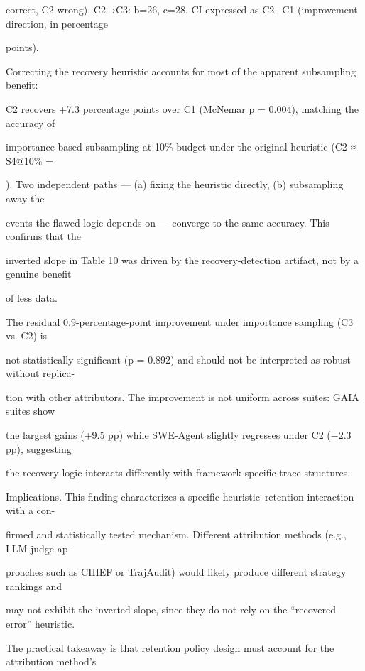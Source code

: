 \begin{flushleft}
\noindent  correct, C2 wrong). C2→C3: b=26, c=28. CI expressed as C2−C1 (improvement direction, in percentage\par
\noindent  points).\par
\par\smallskip
\noindent  Correcting the recovery heuristic accounts for most of the apparent subsampling benefit:\par
\noindent C2 recovers +7.3 percentage points over C1 (McNemar p = 0.004), matching the accuracy of\par
\noindent importance-based subsampling at 10\% budget under the original heuristic (C2 ≈ S4@10\% =\par
{}). Two independent paths — (a) fixing the heuristic directly, (b) subsampling away the\par
\noindent events the flawed logic depends on — converge to the same accuracy. This confirms that the\par
\noindent inverted slope in Table 10 was driven by the recovery-detection artifact, not by a genuine benefit\par
\noindent of less data.\par
\noindent  The residual 0.9-percentage-point improvement under importance sampling (C3 vs. C2) is\par
\noindent not statistically significant (p = 0.892) and should not be interpreted as robust without replica-\par
\noindent tion with other attributors. The improvement is not uniform across suites: GAIA suites show\par
\noindent the largest gains (+9.5 pp) while SWE-Agent slightly regresses under C2 (−2.3 pp), suggesting\par
\noindent the recovery logic interacts differently with framework-specific trace structures.\par
\par\smallskip
\noindent Implications. This finding characterizes a specific heuristic–retention interaction with a con-\par
\noindent firmed and statistically tested mechanism. Different attribution methods (e.g., LLM-judge ap-\par
\noindent proaches such as CHIEF or TrajAudit) would likely produce different strategy rankings and\par
\noindent may not exhibit the inverted slope, since they do not rely on the “recovered error” heuristic.\par
\noindent The practical takeaway is that retention policy design must account for the attribution method’s\par

\end{flushleft}
